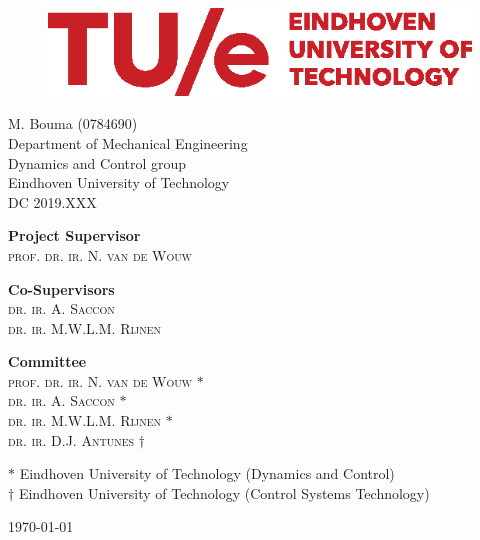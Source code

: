 \documentclass[DC2017114Bouma.tex]{subfiles}
\begin{document}
\begin{figure}[H]
\centering
\begin{minipage}{.7\textwidth}
  \includegraphics[width=1\linewidth]{TUe-logo-descriptor-line-scarlet-rgb.eps}
\end{minipage}
\end{figure}  

\begin{center}

\vspace*{20pt}
\huge{\textbf{\mytitle}}

\vspace*{30pt}
{\Large M. Bouma (0784690)}\\
\large{Department of Mechanical Engineering\\
			Dynamics and Control group\\
			Eindhoven University of Technology}\\
{\large DC 2019.XXX}

\end{center}

\vspace{3cm}

\begin{flushleft} 
	\textbf{Project Supervisor}\\
	\textsc{prof. dr. ir. N. van de Wouw}
\end{flushleft}
\vspace{.1cm}
\begin{flushleft} 
	\textbf{Co-Supervisors}\\
	\textsc{dr. ir. A. Saccon}\\
	\textsc{dr. ir. M.W.L.M. Rijnen}
\end{flushleft}
\vspace{.1cm}
\begin{flushleft} 
	\textbf{Committee}\\
	\textsc{prof. dr. ir. N. van de Wouw} $*$\\
	\textsc{dr. ir. A. Saccon} $*$\\
	\textsc{dr. ir. M.W.L.M. Rijnen} $*$\\
	\textsc{dr. ir. D.J. Antunes} $\dagger$
\end{flushleft}
\vfill
{\small $*$ Eindhoven University of Technology (Dynamics and Control)}\\
{\small $\dagger$ Eindhoven University of Technology (Control Systems Technology)}
\bigskip

\today
\end{document}
